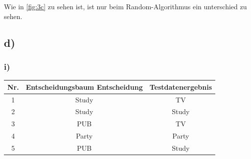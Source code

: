 \documentclass[a4paper,parskip=full-]{article}
\begin{document}
Wie in \autoref{fig:3c} zu sehen ist, ist nur beim Random-Algorithmus ein unterschied zu sehen.


\subsection{d)}
\subsubsection{i)}
\begin{tabular}{|c|c|c|}
\hline
Nr. & Entscheidungsbaum Entscheidung & Testdatenergebnis \\
\hline
\rowcolor{red} 1 & Study & TV \\
\hline
\rowcolor{green} 2 & Study & Study \\
\hline
\rowcolor{red} 3 & PUB & TV \\
\hline
\rowcolor{green} 4 & Party & Party \\
\hline
\rowcolor{red} 5 & PUB & Study \\
\hline
\end{tabular}
\end{document}
